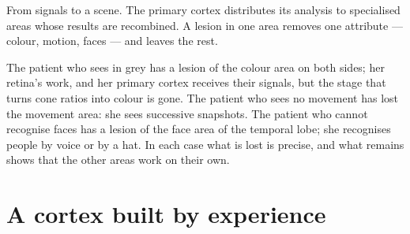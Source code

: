 \begin{omfigure}

{\small From signals to a scene. The primary cortex distributes its
analysis to specialised areas whose results are recombined. A lesion
in one area removes one attribute --- colour, motion, faces --- and
leaves the rest.}
\end{omfigure}

\begin{example}\label{ex:g11:vision-and-brain:patients}
The patient who sees in grey has a lesion of the colour area on both
sides; her retina's  work, and her primary cortex receives their
signals, but the stage that turns cone ratios into colour is gone.
The patient who sees no movement has lost the movement area: she sees
successive snapshots. The patient who cannot recognise faces has a
lesion of the face area of the temporal lobe; she recognises people
by voice or by a hat. In each case what is lost is precise, and what
remains shows that the other areas work on their own.
\end{example}

\section{A cortex built by experience}

